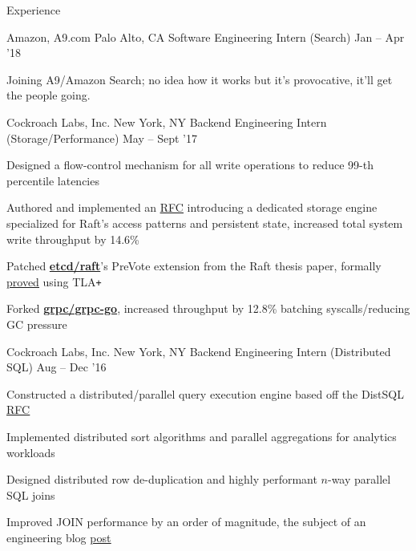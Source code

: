 \documentclass{resume} %
\begin{document}
\begin{rSection}{Experience}
  \begin{rSubsection}{Amazon, A9.com}
                     {Palo Alto, CA}
                     {Software Engineering Intern (Search)}
                     {Jan -- Apr '18}
    \item Joining A9/Amazon Search; no idea how it works but it's provocative,
      it'll get the people going.
  \end{rSubsection}

  \begin{rSubsection}{Cockroach Labs, Inc.}
                     {New York, NY}
                     {Backend Engineering Intern (Storage/Performance)}
                     {May -- Sept '17}

    \item Designed a flow-control mechanism for all write operations to reduce
      99-th percentile latencies
    \item Authored and implemented an
      \href{https://github.com/cockroachdb/cockroach/pull/16361}{\underline {RFC}} introducing
      a dedicated storage
      engine specialized for Raft's access patterns and persistent state, increased
      total system write throughput by 14.6\%
    \item Patched
      \href{https://github.com/coreos/etcd/pull/8288}{\textbf{etcd/raft}}'s
      PreVote extension from the Raft thesis paper, formally
      \href{https://github.com/irfansharif/raft.tla/commit/22b05818b6bcfe6719a708f2270a1308fecbc0fa}{\underline {proved}}
      using TLA\texttt{+}
    \item Forked \href{https://github.com/irfansharif/grpc-go}{\textbf{grpc/grpc-go}},
      increased throughput by 12.8\% batching syscalls/reducing GC pressure
  \end{rSubsection}

  \begin{rSubsection}{Cockroach Labs, Inc.}
                     {New York, NY}
                     {Backend Engineering Intern (Distributed SQL)}
                     {Aug -- Dec '16}

    \item Constructed a distributed/parallel query execution engine based off
      the DistSQL
      \href{https://github.com/cockroachdb/cockroach/blob/master/docs/RFCS/20160421_distributed_sql.md}{\underline
      {RFC}}
    \item Implemented distributed sort algorithms and parallel aggregations for
      analytics workloads
    \item Designed distributed row de-duplication and highly performant $n$-way
      parallel SQL joins
    \item Improved JOIN performance by an order of magnitude, the
      subject of an engineering blog
      \href{https://www.cockroachlabs.com/blog/better-sql-joins-in-cockroachdb/}{\underline
      {post}}
  \end{rSubsection}


\end{rSection}
\end{document}
